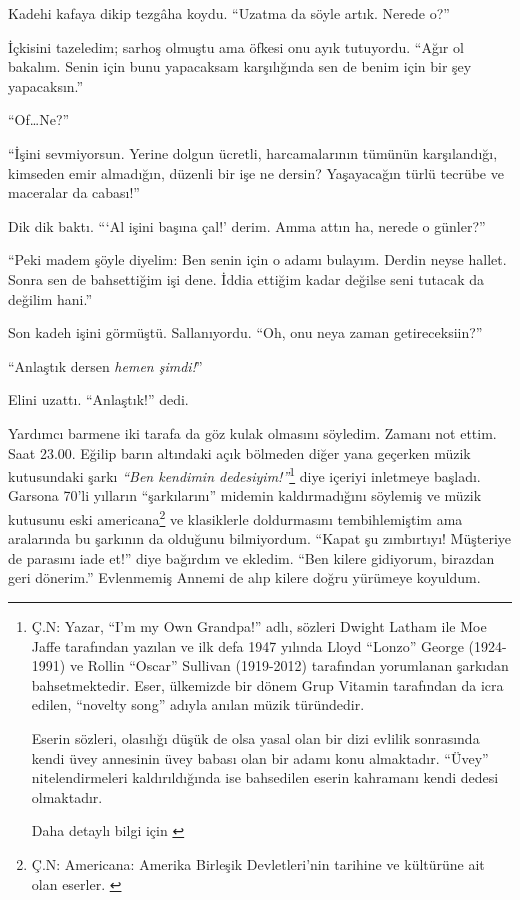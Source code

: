 Kadehi kafaya dikip tezgâha koydu. ``Uzatma da söyle artık. Nerede o?''

İçkisini tazeledim; sarhoş olmuştu ama öfkesi onu ayık tutuyordu. ``Ağır ol
bakalım. Senin için bunu yapacaksam karşılığında sen de benim için bir şey
yapacaksın.''

``Of\dots Ne?''

``İşini sevmiyorsun. Yerine dolgun ücretli, harcamalarının tümünün karşılandığı,
kimseden emir almadığın, düzenli bir işe ne dersin? Yaşayacağın türlü tecrübe ve
maceralar da cabası!''

Dik dik baktı. ```Al işini başına çal!' derim. Amma attın ha, nerede o günler?''

``Peki madem şöyle diyelim: Ben senin için o adamı bulayım. Derdin neyse hallet.
Sonra sen de bahsettiğim işi dene. İddia ettiğim kadar değilse seni tutacak da
değilim hani.''

Son kadeh işini görmüştü. Sallanıyordu. ``Oh, onu neya zaman getireceksiin?''

``Anlaştık dersen \emph{hemen şimdi!}''

Elini uzattı. ``Anlaştık!'' dedi.

Yardımcı barmene iki tarafa da göz kulak olmasını söyledim. Zamanı not
ettim. Saat 23.00. Eğilip barın altındaki açık bölmeden diğer yana geçerken
müzik kutusundaki şarkı \emph{``Ben kendimin  dedesiyim!''}\footnote{%
Ç.N: Yazar, ``I'm my Own Grandpa!'' adlı, sözleri Dwight Latham ile Moe Jaffe
tarafından yazılan ve ilk defa 1947 yılında Lloyd ``Lonzo'' George (1924-1991)
ve Rollin ``Oscar'' Sullivan (1919-2012) tarafından yorumlanan şarkıdan
bahsetmektedir. \citep{WkGrandpa12} Eser, ülkemizde bir dönem Grup Vitamin
tarafından da icra edilen, ``novelty song'' adıyla anılan müzik türündedir.

Eserin sözleri, olasılığı düşük de olsa yasal olan bir dizi evlilik sonrasında
kendi üvey annesinin üvey babası olan bir adamı konu almaktadır. ``Üvey''
nitelendirmeleri kaldırıldığında ise bahsedilen eserin kahramanı kendi dedesi
olmaktadır. \citep{WkGrandpa12}

Daha detaylı bilgi için \citealp[bkz.][]{alipGrandpa13}
}
diye içeriyi inletmeye başladı. Garsona 70'li yılların ``şarkılarını'' midemin
kaldırmadığını söylemiş ve müzik kutusunu eski americana\footnote{%
Ç.N: Americana: Amerika Birleşik Devletleri'nin tarihine ve kültürüne ait olan
eserler. \citep{TrAmericana}
}
ve klasiklerle
doldurmasını tembihlemiştim ama aralarında bu şarkının da olduğunu bilmiyordum.
``Kapat şu zımbırtıyı! Müşteriye de parasını iade et!'' diye bağırdım ve ekledim.
``Ben kilere gidiyorum, birazdan geri dönerim.'' Evlenmemiş Annemi de alıp
kilere doğru yürümeye koyuldum.

